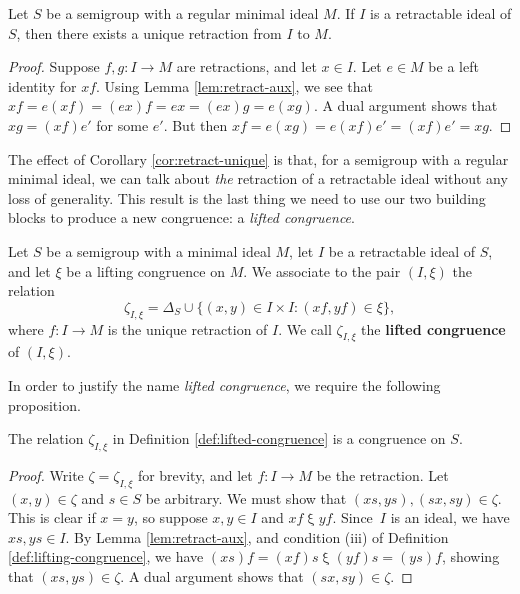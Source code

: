 \begin{corollary}
  \label{cor:retract-unique}
  Let $S$ be a semigroup with a regular minimal ideal $M$.  If $I$ is a
  retractable ideal of $S$, then there exists a unique retraction from $I$ to
  $M$.
  \begin{proof}
    Suppose $f,g:I\to M$ are retractions, and let $x\in I$.  Let $e\in M$ be a
    left identity for $xf$.  Using Lemma \ref{lem:retract-aux}, we see that
    $xf = e (xf) = (ex)f = ex = (ex)g = e (xg)$.  A dual argument shows that
    $xg=(xf) e'$ for some $e'$.  But then $xf = e (xg) = e (xf) e' = (xf)e'=xg$.
  \end{proof}
\end{corollary}

The effect of Corollary \ref{cor:retract-unique} is that, for a semigroup with a
regular minimal ideal, we can talk about \textit{the} retraction of a
retractable ideal without any loss of generality.  This result is the last thing
we need to use our two building blocks to produce a new congruence: a
\textit{lifted congruence}.

\begin{definition}
  \label{def:lifted-congruence}
  Let $S$ be a semigroup with a minimal ideal $M$, let $I$ be a retractable
  ideal of $S$, and let $\xi$ be a lifting congruence on $M$.  We associate to
  the pair $(I,\xi)$ the relation
  $$\zeta_{I,\xi}= \Delta_S \cup \{(x,y) \in I \times I : (xf,yf) \in \xi\},$$
  where $f:I \to M$ is the unique retraction of $I$.
  We call $\zeta_{I,\xi}$ the \textbf{lifted congruence} of $(I,\xi)$.
\end{definition}

In order to justify the name \textit{lifted congruence}, we require the
following proposition.

\begin{proposition}\label{prop:lift}
  The relation $\zeta_{I,\xi}$ in Definition \ref{def:lifted-congruence} is a
  congruence on $S$.
  \begin{proof}
    Write $\zeta=\zeta_{I,\xi}$ for brevity, and let $f:I\to M$ be the
    retraction.  Let $(x,y)\in\zeta$ and $s\in S$ be arbitrary.  We must show
    that $(xs,ys),(sx,sy)\in\zeta$.  This is clear if $x=y$, so suppose
    $x,y\in I$ and $xf\mathrel\xi yf$.  Since~$I$ is an ideal, we have
    $xs,ys\in I$.  By Lemma \ref{lem:retract-aux}, and condition (iii) of
    Definition \ref{def:lifting-congruence}, we have
    $(xs)f = (xf)s \mathrel\xi (yf)s = (ys)f$, showing that $(xs,ys)\in\zeta$.
    A dual argument shows that $(sx,sy)\in\zeta$.
\end{proof}
\end{proposition}

